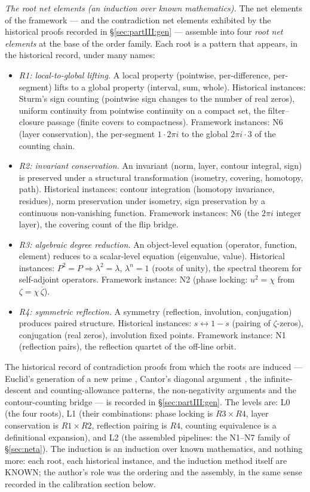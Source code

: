 \documentclass{article}
\begin{document}
\emph{The root net elements (an induction over known mathematics).}
The net elements of the framework --- and the contradiction net
elements exhibited by the historical proofs recorded in
\S\ref{sec:partIII:gen} --- assemble into four \emph{root net
elements} at the base of the order family. Each root is a pattern
that appears, in the historical record, under many names:
\begin{itemize}
\item \emph{R1: local-to-global lifting.} A local property (pointwise,
  per-difference, per-segment) lifts to a global property (interval,
  sum, whole). Historical instances: Sturm's sign counting
  \cite{sturm1835} (pointwise sign changes to the number of real
  zeros), uniform continuity from pointwise continuity on a compact
  set, the filter--closure passage (finite covers to compactness).
  Framework instances: N6 (layer conservation), the per-segment
  $1\cdot2\pi i$ to the global $2\pi i\cdot3$ of the counting chain.
\item \emph{R2: invariant conservation.} An invariant (norm, layer,
  contour integral, sign) is preserved under a structural
  transformation (isometry, covering, homotopy, path).
  Historical instances: contour integration \cite{cauchy1825}
  (homotopy invariance, residues), norm preservation under isometry,
  sign preservation by a continuous non-vanishing function.
  Framework instances: N6 (the $2\pi i$ integer layer), the covering
  count of the flip bridge.
\item \emph{R3: algebraic degree reduction.} An object-level equation
  (operator, function, element) reduces to a scalar-level equation
  (eigenvalue, value). Historical instances: $P^2=P\Rightarrow
  \lambda^2=\lambda$, $\lambda^n=1$ (roots of unity), the spectral
  theorem for self-adjoint operators. Framework instance: N2 (phase
  locking: $u^2=\chi$ from $\zeta=\chi\,\overline\zeta$).
\item \emph{R4: symmetric reflection.} A symmetry (reflection,
  involution, conjugation) produces paired structure.
  Historical instances: $s\leftrightarrow1-s$ (pairing of
  $\zeta$-zeros), conjugation (real zeros), involution fixed points.
  Framework instance: N1 (reflection pairs), the reflection quartet
  of the off-line orbit.
\end{itemize}
The historical record of contradiction proofs from which the roots
are induced --- Euclid's generation of a new prime \cite{euclid},
Cantor's diagonal argument \cite{cantor1891}, the infinite-descent
and counting-allowance patterns, the non-negativity arguments and
the contour-counting bridge \cite{perron1908, polyag1918} --- is
recorded in \S\ref{sec:partIII:gen}. The levels are:
L0 (the four roots), L1 (their combinations: phase locking is
$R3\times R4$, layer conservation is $R1\times R2$, reflection
pairing is $R4$, counting equivalence is a definitional expansion),
and L2 (the assembled pipelines: the N1--N7 family of
\S\ref{sec:neta}). The induction is an induction over known
mathematics, and nothing more: each root, each historical instance,
and the induction method itself are KNOWN; the author's role was the
ordering and the assembly, in the same sense recorded in the
calibration section below.
\end{document}
